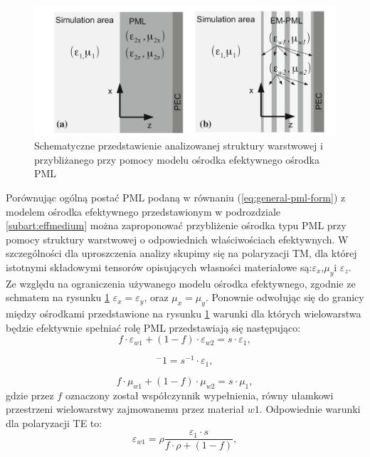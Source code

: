 \begin{figure}[tb]
	\includegraphics[width=\textwidth]{images/pml/oqe_schemat.png}
	\caption{Schematyczne przedstawienie analizowanej struktury warstwowej i przybliżanego przy pomocy modelu ośrodka efektywnego ośrodka PML}
	\label{fig:pml-multilay-schem}
\end{figure}

Porównując ogólną postać PML podaną w równaniu (\ref{eq:general-pml-form}) z modelem ośrodka efektywnego przedstawionym w podrozdziale \ref{subart:effmedium} można zaproponować przybliżenie ośrodka typu PML przy pomocy struktury warstwowej o odpowiednich właściwościach efektywnych. W szczególności dla uproszczenia analizy skupimy się na polaryzacji TM, dla której istotnymi składowymi tensorów opisujących własności materiałowe są:$\varepsilon_x$,$\mu_y$i $\varepsilon_z$. Ze względu na ograniczenia używanego modelu ośrodka efektywnego, zgodnie ze schmatem na rysunku \ref{fig:pml-multilay-schem} $\varepsilon_x=\varepsilon_y$, oraz $\mu_x=\mu_y$. Ponownie odwołując się do granicy między ośrodkami przedstawione na rysunku \ref{fig:pml-multilay-schem} warunki dla których wielowarstwa będzie efektywnie spełniać rolę PML przedstawiają się następująco:
\begin{equation}
	f\cdot \varepsilon_{w1} + (1-f)\cdot \varepsilon_{w2} = s \cdot \varepsilon_1,
\end{equation}

\begin{equation}
	[f\cdot \varepsilon_{w1}^{-1}+(1-f)\varepsilon_{w2}^{-1}]^-1=s^{-1}\cdot \varepsilon_1,
\end{equation}

\begin{equation}
	f\cdot \mu_{w1} + (1-f)\cdot \mu_{w2} = s \cdot \mu_1,
\end{equation}
gdzie przez $f$ oznaczony został współczynnik wypełnienia, równy ułamkowi przestrzeni wielowarstwy zajmowanemu przez materiał $w1$. Odpowiednie warunki dla polaryzacji TE to:
\begin{equation}
	\varepsilon_{w1}=\rho \frac{\varepsilon_1 \cdot s}{f\cdot \rho + (1 -f) },
	\label{eq:te-eps1}
\end{equation}

